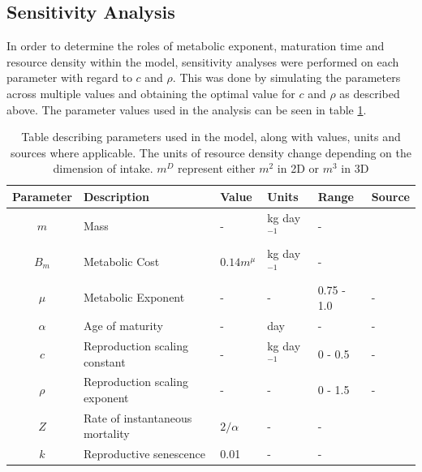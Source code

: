 \documentclass[a4paper, 11pt, hidelinks]{article} %
\begin{document}
	
	\subsection{Sensitivity Analysis}

	In order to determine the roles of metabolic exponent, maturation time and resource density within the model, sensitivity analyses were performed on each parameter with regard to $c$ and $\rho$.  This was done by simulating the parameters across multiple values and obtaining the optimal value for $c$ and $\rho$ as described above.
	The parameter values used in the analysis can be seen in table \ref{parameters}.
	
	\begin{centering}
		
		
		\begin{table}[h!]
			
			\caption{Table describing parameters used in the model, along with values, units and sources where applicable.  The units of resource density change depending on the dimension of intake.  $m^D$ represent either $m^2$ in 2D or $m^3$ in 3D} 
			\label{parameters}
			\vspace{2mm}
			\begin{tabular}{c p{3.6cm} l l l p{3cm}}
				\hline
				Parameter 	& Description 			& Value 	& Units 	& Range 		& Source \\
				\hline
				$m$			& Mass					& -			& kg day$^{-1}$& -			&		\\
				
				$B_m$		& Metabolic Cost		& $0.14 m^{\mu}$ & kg day$^{-1}$& - 	& \cite{Peters1983}\\
				$\mu$		& Metabolic Exponent	& -			&	-		& 0.75 - 1.0	& - \\
				$\alpha$	& Age of maturity		& -     	& day		& -				& -\\
				$c$			& Reproduction scaling constant & - & kg day$^{-1}$& 0 - 0.5 		& -\\
				$\rho$		& Reproduction scaling exponent	& -	&	-		& 0 - 1.5			& -\\
				$Z$			& Rate of instantaneous mortality& $2/\alpha$	& -&-& \cite{Charnov2001}\\%
				$k$			& Reproductive senescence & 0.01	& -			& -				\\
				

\end{tabular}
\end{table}
\end{centering}
\end{document}
